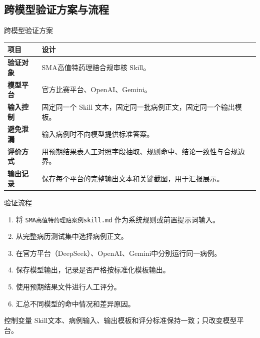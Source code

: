 \subsection{跨模型验证方案与流程}
\begin{frame}[fragile]{跨模型验证方案}
  \begin{tabularx}{\textwidth}{>{\bfseries}l X}
    \toprule
    项目 & 设计 \\
    \midrule
    验证对象 & SMA高值特药理赔合规审核 Skill。 \\
    模型平台 & 官方比赛平台、OpenAI、Gemini。 \\
    输入控制 & 固定同一个 Skill 文本，固定同一批病例正文，固定同一个输出模板。 \\
    避免泄漏 & 输入病例时不向模型提供标准答案。 \\
    评价方式 & 用预期结果表人工对照字段抽取、规则命中、结论一致性与合规边界。 \\
    输出记录 & 保存每个平台的完整输出文本和关键截图，用于汇报展示。 \\
    \bottomrule
  \end{tabularx}
\end{frame}

\begin{frame}[fragile]{验证流程}
  \begin{enumerate}
    \item 将 \texttt{SMA高值特药理赔案例skill.md} 作为系统规则或前置提示词输入。
    \item 从完整病历测试集中选择病例正文。
    \item 在官方平台（DeepSeek）、OpenAI、Gemini中分别运行同一病例。
    \item 保存模型输出，记录是否严格按标准化模板输出。
    \item 使用预期结果文件进行人工评分。
    \item 汇总不同模型的命中情况和差异原因。
  \end{enumerate}

  \vspace{0.3cm}
  \begin{block}{控制变量}
    Skill文本、病例输入、输出模板和评分标准保持一致；只改变模型平台。
  \end{block}
\end{frame}

